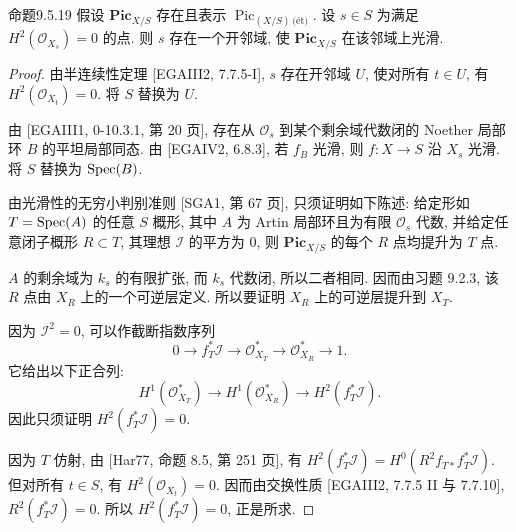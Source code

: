 \begin{origstatement}{命题}{9.5.19}\label{ch09s05:prop9.5.19}
假设 $\mathbf{Pic}_{X/S}$ 存在且表示 $\operatorname{Pic}_{(X/S)\,\text{(\'{e}t)}}$. 设 $s\in S$ 为满足 $H^2(\mathcal O_{X_s})=0$ 的点. 则 $s$ 存在一个开邻域, 使 $\mathbf{Pic}_{X/S}$ 在该邻域上光滑.
\end{origstatement}
\begin{proof}
由半连续性定理 [EGAIII2, 7.7.5-I], $s$ 存在开邻域 $U$, 使对所有 $t\in U$, 有 $H^2(\mathcal O_{X_t})=0$. 将 $S$ 替换为 $U$.

由 [EGAIII1, 0-10.3.1, 第 20 页], 存在从 $\mathcal O_s$ 到某个剩余域代数闭的 Noether 局部环 $B$ 的平坦局部同态. 由 [EGAIV2, 6.8.3], 若 $f_B$ 光滑, 则 $f:X\to S$ 沿 $X_s$ 光滑. 将 $S$ 替换为 $\operatorname{Spec}(B)$.

由光滑性的无穷小判别准则 [SGA1, 第 67 页], 只须证明如下陈述: 给定形如 $T=\operatorname{Spec}(A)$ 的任意 $S$ 概形, 其中 $A$ 为 Artin 局部环且为有限 $\mathcal O_s$ 代数, 并给定任意闭子概形 $R\subset T$, 其理想 $\mathcal I$ 的平方为 $0$, 则 $\mathbf{Pic}_{X/S}$ 的每个 $R$ 点均提升为 $T$ 点.

$A$ 的剩余域为 $k_s$ 的有限扩张, 而 $k_s$ 代数闭, 所以二者相同. 因而由习题 9.2.3, 该 $R$ 点由 $X_R$ 上的一个可逆层定义. 所以要证明 $X_R$ 上的可逆层提升到 $X_T$.


因为 $\mathcal I^2=0$, 可以作截断指数序列
\[
 0\longrightarrow f_T^*\mathcal I\longrightarrow\mathcal O_{X_T}^*
 \longrightarrow\mathcal O_{X_R}^*\longrightarrow1.
\]
它给出以下正合列:
\[
 H^1(\mathcal O_{X_T}^*)\longrightarrow H^1(\mathcal O_{X_R}^*)\longrightarrow H^2(f_T^*\mathcal I).
\]
因此只须证明 $H^2(f_T^*\mathcal I)=0$.

因为 $T$ 仿射, 由 [Har77, 命题 8.5, 第 251 页], 有 $H^2(f_T^*\mathcal I)=H^0(R^2f_{T*}f_T^*\mathcal I)$. 但对所有 $t\in S$, 有 $H^2(\mathcal O_{X_t})=0$. 因而由交换性质 [EGAIII2, 7.7.5 II 与 7.7.10], $R^2(f_T^*\mathcal I)=0$. 所以 $H^2(f_T^*\mathcal I)=0$, 正是所求.
\end{proof}

